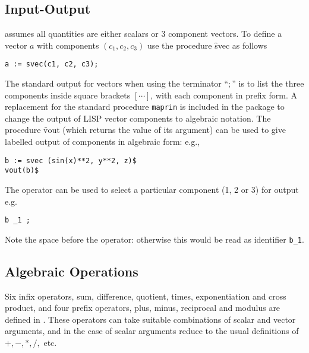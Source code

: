 \subsection{Input-Output}

 assumes all quantities are either scalars or 3 component
vectors.  To define a vector $a$ with components $(c_1, c_2, c_3)$ use
the procedure \f{svec} as follows 
\hypertarget{operator:SVEC}{}
\begin{verbatim}
a := svec(c1, c2, c3);
\end{verbatim}

The standard \REDUCE output for vectors when using the terminator ``$;$''
is to list the three components inside square brackets
$[\cdots]$, with each component in prefix form.  A replacement for the
standard \REDUCE procedure \texttt{maprin} is included in
the package to change the 
output of LISP vector components to algebraic notation.  The procedure
 \f{vout} (which returns the value of its argument)
can be used to give labelled output of components 
in algebraic form: e.g.,
\begin{verbatim}
b := svec (sin(x)**2, y**2, z)$
vout(b)$
\end{verbatim}

The operator \texttt{\textunderscore} can be used to select a particular 
component (1, 2 or 3) for output e.g.
\begin{verbatim}
b _1 ;
\end{verbatim}
Note the space before the \texttt{\textunderscore} operator: otherwise this would be read as identifier \texttt{b\_1}.

\subsection{Algebraic Operations}

Six infix operators, sum, difference, quotient, times, exponentiation
and cross product, and four prefix
operators, plus, minus, reciprocal
and  modulus are defined in .  These operators can take suitable
combinations of scalar and vector arguments,
and in the case of scalar arguments reduce to the usual definitions of
$ +, -, *, /, $ etc.

